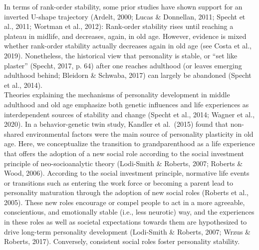 \documentclass[
  english,
  man, noextraspace]{apa7}
\begin{document}
In terms of rank-order stability, some prior studies have shown support for an inverted U-shape trajectory (Ardelt, 2000; Lucas \& Donnellan, 2011; Specht et al., 2011; Wortman et al., 2012): Rank-order stability rises until reaching a plateau in midlife, and decreases, again, in old age. However, evidence is mixed whether rank-order stability actually decreases again in old age (see Costa et al., 2019). Nonetheless, the historical view that personality is stable, or \enquote{set like plaster} (Specht, 2017, p. 64) after one reaches adulthood (or leaves emerging adulthood behind; Bleidorn \& Schwaba, 2017) can largely be abandoned (Specht et al., 2014).\\
Theories explaining the mechanisms of personality development in middle adulthood and old age emphasize both genetic influences and life experiences as interdependent sources of stability and change (Specht et al., 2014; Wagner et al., 2020). In a behavior-genetic twin study, Kandler et al.~(2015) found that non-shared environmental factors were the main source of personality plasticity in old age. Here, we conceptualize the transition to grandparenthood as a life experience that offers the adoption of a new social role according to the social investment principle of neo-socioanalytic theory (Lodi-Smith \& Roberts, 2007; Roberts \& Wood, 2006). According to the social investment principle, normative life events or transitions such as entering the work force or becoming a parent lead to personality maturation through the adoption of new social roles (Roberts et al., 2005). These new roles encourage or compel people to act in a more agreeable, conscientious, and emotionally stable (i.e., less neurotic) way, and the experiences in these roles as well as societal expectations towards them are hypothesized to drive long-term personality development (Lodi-Smith \& Roberts, 2007; Wrzus \& Roberts, 2017). Conversely, consistent social roles foster personality stability.\\
\end{document}
